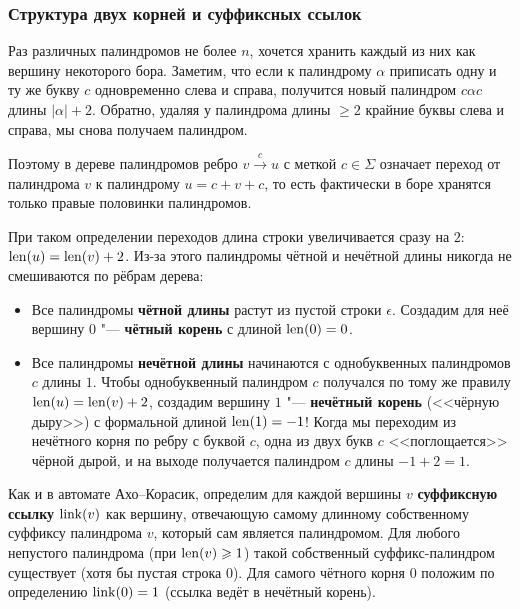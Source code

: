 \subsubsection{Структура двух корней и суффиксных ссылок}

Раз различных палиндромов не более $n$, хочется хранить каждый из них как вершину некоторого бора. Заметим, что если к палиндрому $\alpha$ приписать одну и ту же букву $c$ одновременно слева и справа, получится новый палиндром $c\alpha c$ длины $|\alpha| + 2$. Обратно, удаляя у палиндрома длины $\ge 2$ крайние буквы слева и справа, мы снова получаем палиндром.

Поэтому в дереве палиндромов ребро $v \xrightarrow{c} u$ с меткой $c \in \Sigma$ означает переход от палиндрома $v$ к палиндрому $u = c + v + c$, то есть фактически в боре хранятся только правые половинки палиндромов.

При таком определении переходов длина строки увеличивается сразу на $2$: $\operatorname{len}(u) = \operatorname{len}(v) + 2$. Из-за этого палиндромы чётной и нечётной длины никогда не смешиваются по рёбрам дерева:
\begin{itemize}
    \item Все палиндромы \textbf{чётной длины} растут из пустой строки $\epsilon$. Создадим для неё вершину $0$ "--- \textbf{чётный корень} с длиной $\operatorname{len}(0) = 0$.
    \item Все палиндромы \textbf{нечётной длины} начинаются с однобуквенных палиндромов $c$ длины $1$. Чтобы однобуквенный палиндром $c$ получался по тому же правилу $\operatorname{len}(u) = \operatorname{len}(v) + 2$, создадим вершину $1$ "--- \textbf{нечётный корень} (<<чёрную дыру>>) с формальной длиной $\operatorname{len}(1) = -1$! Когда мы переходим из нечётного корня по ребру с буквой $c$, одна из двух букв $c$ <<поглощается>> чёрной дырой, и на выходе получается палиндром $c$ длины $-1 + 2 = 1$.
\end{itemize}

Как и в автомате Ахо--Корасик, определим для каждой вершины $v$ \textbf{суффиксную ссылку} $\operatorname{link}(v)$ как вершину, отвечающую самому длинному собственному суффиксу палиндрома $v$, который сам является палиндромом. Для любого непустого палиндрома (при $\operatorname{len}(v) \geqslant 1$) такой собственный суффикс-палиндром существует (хотя бы пустая строка $0$). Для самого чётного корня $0$ положим по определению $\operatorname{link}(0) = 1$ (ссылка ведёт в нечётный корень).

